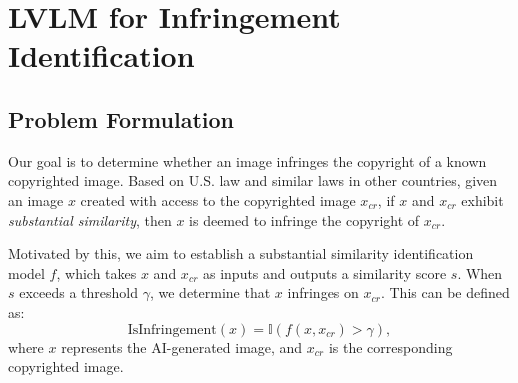 \section{LVLM for Infringement Identification}
\label{identification}

\subsection{Problem Formulation}
Our goal is to determine whether an image infringes the copyright of a known copyrighted image. Based on U.S. law \cite{roth_greeting_cards_wikipedia} and similar laws in other countries, given an image $x$ created with access to the copyrighted image $x_{cr}$, if $x$ and $x_{cr}$ exhibit \textit{substantial similarity}, then $x$ is deemed to infringe the copyright of $x_{cr}$. 

Motivated by this, we aim to establish a substantial similarity identification model $f$, which takes 
$x$ and $x_{cr}$ as inputs and outputs a similarity score $s$. When $s$ exceeds a threshold $\gamma$, we determine that $x$ infringes on $x_{cr}$. This can be defined as:
\begin{equation}
\text{IsInfringement}(x) = \mathbb{I}(f(x, x_{{cr}}) > \gamma),
\end{equation}
where $x$ represents the AI-generated image, and $x_{cr}$ is the corresponding copyrighted image. 


